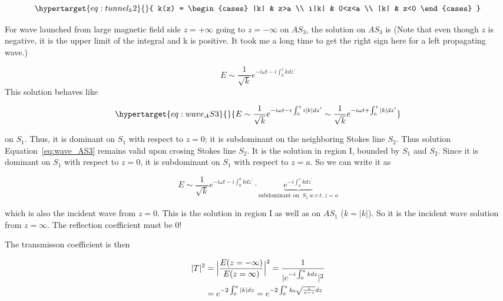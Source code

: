 \documentclass[
  notoc %
]{tufte-book}
\begin{document}
\begin{equation}\protect\hypertarget{eq:tunnel_k2}{}{
k(z) =
\begin{cases}
|k| & z>a \\
i|k| & 0<z<a \\
|k| & z<0
\end{cases}
}\label{eq:tunnel_k2}\end{equation}

For wave launched from large magnetic field side \(z=+\infty\) going to
\(z=-\infty\) on \(AS_3\), the solution on \(AS_3\) is (Note that even
though \(z\) is negative, it is the upper limit of the integral and k is
positive. It took me a long time to get the right sign here for a left
propagating wave.)

\[
E\sim \frac{1}{\sqrt{k}}e^{-i\omega t- i \int_0^z kdz^\prime}
\] This solution behaves like

\begin{equation}\protect\hypertarget{eq:wave_AS3}{}{
E\sim  \frac{1}{\sqrt{k}} e^{-i\omega t- i \int_0^z i|k|dz^\prime} \sim \frac{1}{\sqrt{k}} e^{-i\omega t + \int_0^z |k|dz^\prime}
}\label{eq:wave_AS3}\end{equation}

on \(S_1\). Thus, it is dominant on \(S_1\) with respect to \(z=0\); it
is subdominant on the neighboring Stokes line \(S_2\). Thus solution
Equation~\ref{eq:wave_AS3} remains valid upon crosing Stokes line
\(S_2\). It is the solution in region I, bounded by \(S_1\) and \(S_2\).
Since it is dominant on \(S_1\) with respect to \(z=0\), it is
subdominant on \(S_1\) with respect to \(z=a\). So we can write it as

\[
E \sim \frac{1}{\sqrt{k}}e^{-i\omega t - i\int_0^a kdz^\prime}\cdot \underbrace{e^{-i\int_a^z kdz^\prime}}_{\text{subdominant on }\ S_1\ w.r.t.\ z=a}
\]

which is also the incident wave from \(z=0\). This is the solution in
region I as well as on \(AS_1\) (\(k=|k|\)). So it is the incident wave
solution from \(z=\infty\). The reflection coefficient must be 0!

The transmisson coefficient is then

\[
\begin{aligned}
|T|^2 &= \Big| \frac{E(z=-\infty)}{E(z=\infty)} \Big|^2 = \frac{1}{|e^{-i\int_0^a kdz}|^2} \notag \\
&= e^{-2\int_0^a |k| dz} = e^{-2\int_0^a k_0 \sqrt{\frac{z}{a-z}}dz}
\end{aligned}
\]
\end{document}
